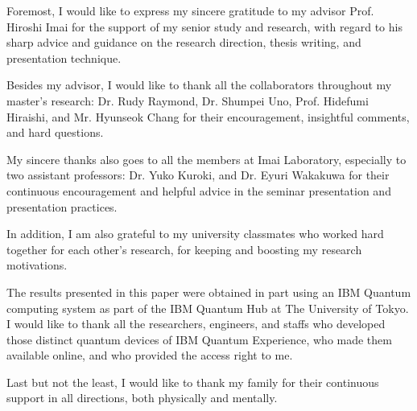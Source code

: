 \begin{acknowledge}

\par Foremost, I would like to express my sincere gratitude to my advisor Prof. Hiroshi Imai for the support of my senior study and research, with regard to his sharp advice and guidance on the research direction, thesis writing, and presentation technique.

\par Besides my advisor, I would like to thank all the collaborators throughout my master's research: Dr. Rudy Raymond, Dr. Shumpei Uno, Prof. Hidefumi Hiraishi, and Mr. Hyunseok Chang for their encouragement, insightful comments, and hard questions.

\par My sincere thanks also goes to all the members at Imai Laboratory, especially to two assistant professors: Dr. Yuko Kuroki, and Dr. Eyuri Wakakuwa for their continuous encouragement and helpful advice in the seminar presentation and presentation practices.

\par In addition, I am also grateful to my university classmates who worked hard together for each other's research, for keeping and boosting my research motivations.

\par The results presented in this paper were obtained in part using an IBM Quantum computing system as part of the IBM Quantum Hub at The University of Tokyo. 
I would like to thank all the researchers, engineers, and staffs who developed those distinct quantum devices of IBM Quantum Experience, who made them available online, and who provided the access right to me.

\par Last but not the least, I would like to thank my family for their continuous support in all directions, both physically and mentally.

\end{acknowledge}

